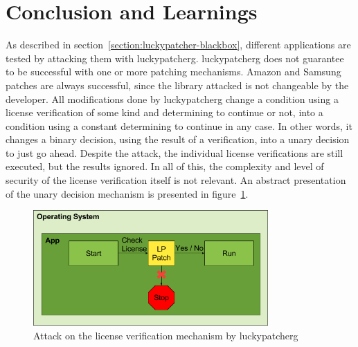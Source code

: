 \newpage
\section{Conclusion and Learnings} \label{section:luckypatcher-learnings}
As described in section~\ref{section:luckypatcher-blackbox}, different applications are tested by attacking them with \gls{luckypatcherg}.
\gls{luckypatcherg} does not guarantee to be successful with one or more patching mechanisms.
Amazon and Samsung patches are always successful, since the library attacked is not changeable by the developer.
\newline
\newline
All modifications done by \gls{luckypatcherg} change a condition using a license verification of some kind and determining to continue or not, into a condition using a constant determining to continue in any case.
In other words, it changes a binary decision, using the result of a verification, into a unary decision to just go ahead.
Despite the attack, the individual license verifications are still executed, but the results ignored.
In all of this, the complexity and level of security of the license verification itself is not relevant.
An abstract presentation of the unary decision mechanism is presented in figure~\ref{fig:verificationNowAttack}.
\newline
\begin{figure}[h]
    \centering
    \includegraphics[width=0.8\textwidth]{data/verificationNowAttack.png}
    \caption{Attack on the license verification mechanism by \gls{luckypatcherg}}
    \label{fig:verificationNowAttack}
\end{figure}
